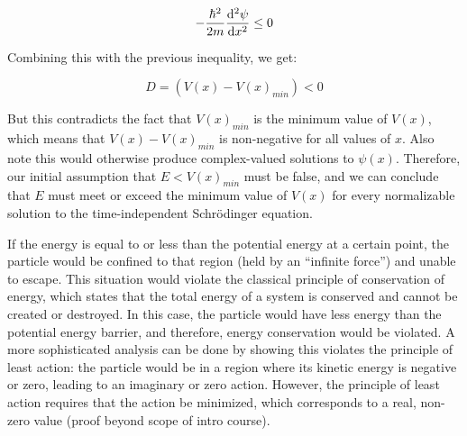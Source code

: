 {	\begin{equation*}
	-\frac{\hbar^2}{2m}\derivative[2]{\psi}{x} \leq 0
	\end{equation*}
	
	Combining this with the previous inequality, we get:
	
	\begin{equation*}
	D = (V(x)-V(x)_{min}) < 0
	\end{equation*}
	
	But this contradicts the fact that $V(x)_{min}$ is the minimum value of $V(x)$, which means that $V(x)-V(x)_{min}$ is non-negative for all values of $x$. Also note this would otherwise produce
	 complex-valued solutions to $\psi(x)$. Therefore, our initial assumption that $E < V(x)_{min}$ must be false, and we can conclude that $E$ must meet or exceed the minimum value of $V(x)$ for every normalizable solution to the time-independent Schrödinger equation.

	If the energy is equal to or less than the potential energy at a certain point, the particle would be confined to that region (held by an ``infinite force'') 
	and unable to escape. This situation would violate the classical principle of conservation of energy, which states that the total energy of a system is conserved
	 and cannot be created or destroyed. In this case, the particle would have less energy than the potential energy barrier, and therefore, energy conservation would be
	violated. A more sophisticated analysis can be done by showing this violates the principle of least action: the particle would be in a region where its kinetic energy
	is negative or zero, leading to an imaginary or zero action. However, the principle of least action requires that the action be minimized, which corresponds to a
	 real, non-zero value (proof beyond scope of intro course).\\\\
}

